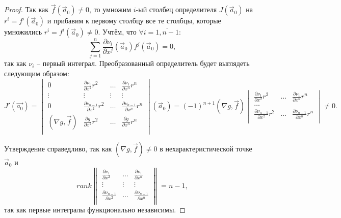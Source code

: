 \begin{proof}
    Так как $\vec{f} \left( \vec{a}_0 \right) \neq 0$, то умножим $i$-ый столбец определителя $J \left( \vec{a}_0 \right)$ на $r^i = f^i \left( \vec{a}_0 \right)$ и прибавим к первому столбцу все те столбцы, которые умножились $r^i = f^i \left( \vec{a}_0 \right) \neq 0$. Учтём, что $\forall i = \overline{1, n - 1}$:
    \begin{equation*}
    	\sum \limits_{j = 1}^n \frac{\partial \nu_i}{\partial x^j} \left( \vec{a}_0 \right) f^j \left( \vec{a}_0 \right) = 0,
    \end{equation*}
    так как $\nu_i$ -- первый интеграл. 
    Преобразованный определитель будет выглядеть следующим образом:
    \begin{equation*}
    	J' \left( \vec{a_0} \right) =
    	\begin{vmatrix}
    		0 & \frac{\partial \nu_1}{\partial x^2} r^2 & \dots & \frac{\partial \nu_1}{\partial x^n} r^n                                           \\
    		\vdots & \vdots & \vdots & \vdots                                                                                                                              \\
    		0 & \frac{\partial \nu_{n - 1}}{\partial x^2} r^2 & \dots & \frac{\partial \nu_{n - 1}}{\partial x^n} r^n                               \\
    		\left( \nabla g, \vec{f} \right) & \frac{\partial g}{\partial x^2} r^2 & \dots & \frac{\partial g}{\partial x^n} r^n \\
    	\end{vmatrix}  \left( \vec{a}_0 \right) = \left( -1 \right)^{n + 1} \left( \nabla g, \vec{f} \right)
    	\begin{vmatrix}
    		\frac{\partial \nu_1}{\partial x^2} r^2 & \dots & \frac{\partial \nu_1}{\partial x^n} r^n             \\
    		\dots                                                                                                 \\
    		\frac{\partial \nu_{n - 1}}{\partial x^2} r^2 & \dots & \frac{\partial \nu_{n - 1}}{\partial x^n} r^n \\
    	\end{vmatrix} \neq 0.
    \end{equation*}

    Утверждение справедливо, так как $ \left( \nabla g, \vec{f} \right) \neq 0$ в нехарактеристической точке $\vec{a}_0$ и
    \begin{equation*}
    	rank
    	\begin{Vmatrix}
    		\frac{\partial \nu_1}{\partial x^2} & \dots & \frac{\partial \nu_1}{\partial x^n}             \\
    		\vdots & \vdots & \vdots                                                                                        \\
    		\frac{\partial \nu_{n - 1}}{\partial x^2} & \dots & \frac{\partial \nu_{n - 1}}{\partial x^n} \\
    	\end{Vmatrix} = n - 1,
    \end{equation*}
    так как первые интегралы функционально независимы.
    

\end{proof}
